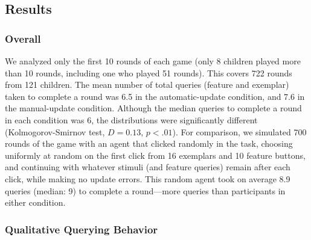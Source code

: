 \documentclass[man,floatsintext]{apa6}
\begin{document}
\subsection{Results}

\subsubsection{Overall}

We analyzed only the first 10 rounds of each game (only 8 children played more than 
10 rounds, including one who played 51 rounds). This covers 722 rounds from 121 
children. The mean number of total queries (feature and exemplar) taken to complete a round was 6.5 in the automatic-update condition, and 7.6 in the manual-update condition. Although the median queries to complete a round in each condition was 6, the distributions were significantly different (Kolmogorov-Smirnov test, $D = 
0.13$, $p<.01$). For comparison, we simulated 700 rounds of the game with an agent that clicked
randomly in the task, choosing uniformly at random on the first click from 16 exemplars and 10 feature buttons, and continuing with whatever stimuli (and feature queries) remain after each click, while making no update errors. This random agent took on average 8.9 queries (median: 9) to complete a round---more queries than participants in either condition.

\subsubsection{Qualitative Querying Behavior}
\end{document}
